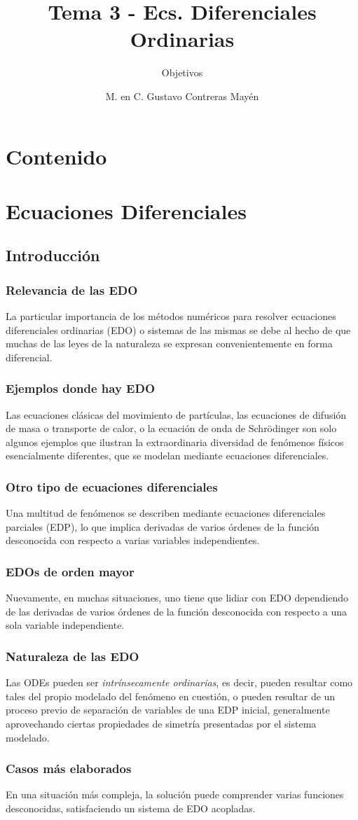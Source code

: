 \documentclass[12pt]{beamer}
\title{Tema 3 - Ecs. Diferenciales Ordinarias}
\subtitle{Objetivos}
\author{M. en C. Gustavo Contreras Mayén}
\begin{document}
\maketitle

\section*{Contenido}

\section{Ecuaciones Diferenciales}
\subsection{Introducción}

\begin{frame}
\frametitle{Relevancia de las EDO}
La particular importancia de los métodos numéricos para resolver ecuaciones diferenciales ordinarias (EDO) o sistemas de las mismas se debe al hecho de que muchas de las leyes de la naturaleza se expresan convenientemente en forma diferencial.
\end{frame}
\begin{frame}
\frametitle{Ejemplos donde hay EDO}
Las ecuaciones clásicas del movimiento de partículas, las ecuaciones de difusión de masa o transporte de calor, o la ecuación de onda de Schrödinger son solo algunos ejemplos que ilustran la extraordinaria diversidad de fenómenos físicos esencialmente diferentes, que se modelan mediante ecuaciones diferenciales.
\end{frame}
\begin{frame}
\frametitle{Otro tipo de ecuaciones diferenciales}
Una multitud de fenómenos se describen mediante ecuaciones diferenciales parciales (EDP), lo que implica derivadas de varios órdenes de la función desconocida con respecto a varias variables independientes. 
\end{frame}
\begin{frame}
\frametitle{EDOs de orden mayor}
Nuevamente, en muchas situaciones, uno tiene que lidiar con EDO dependiendo de las derivadas de varios órdenes de la función desconocida con respecto a una sola variable independiente.
\end{frame}
\begin{frame}
\frametitle{Naturaleza de las EDO}
Las ODEs pueden ser \emph{intrínsecamente ordinarias}, es decir, pueden resultar como tales del propio modelado del fenómeno en cuestión, o pueden resultar de un proceso previo de separación de variables de una EDP inicial, generalmente aprovechando ciertas propiedades de simetría presentadas por el sistema modelado.
\end{frame}
\begin{frame}
\frametitle{Casos más elaborados}
En una situación más compleja, la solución puede comprender varias funciones desconocidas, satisfaciendo un sistema de EDO acopladas.
\end{frame}
\end{document}
